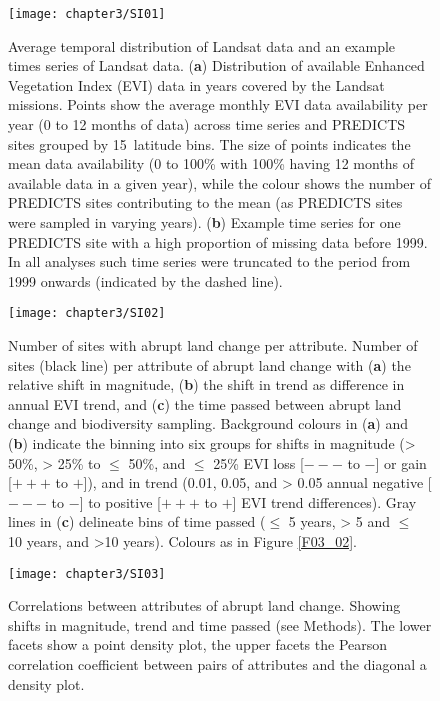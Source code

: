 \begin{figure}[htb]
\centering
\texttt{[image: chapter3/SI01]}
\caption{ Average temporal distribution of Landsat data and an example times series of Landsat data. (\textbf{a}) Distribution of available Enhanced Vegetation Index (EVI) data in years covered by the Landsat missions. Points show the average monthly EVI data availability per year (0 to 12 months of data) across time series and PREDICTS sites grouped by 15\textdegree\ latitude bins. The size of points indicates the mean data availability (0 to 100\% with 100\% having 12 months of available data in a given year), while the colour shows the number of PREDICTS sites contributing to the mean (as PREDICTS sites were sampled in varying years). (\textbf{b}) Example time series for one PREDICTS site with a high proportion of missing data before 1999. In all analyses such time series were truncated to the period from 1999 onwards (indicated by the dashed line).}
\label{SI03_01}
\end{figure}

\begin{figure}[htb]
\centering
\texttt{[image: chapter3/SI02]}
\caption{ Number of sites with abrupt land change per attribute. Number of sites (black line) per attribute of abrupt land change with (\textbf{a}) the relative shift in magnitude, (\textbf{b}) the shift in trend as difference in annual EVI trend, and (\textbf{c}) the time passed between abrupt land change and biodiversity sampling. Background colours in (\textbf{a}) and (\textbf{b}) indicate the binning into six groups for shifts in magnitude (> 50\%, > 25\% to $\leq$ 50\%, and $\leq$ 25\% EVI loss [$---$ to $-$] or gain [$+++$ to $+$]), and in trend (0.01, 0.05, and > 0.05 annual negative [$---$ to $-$] to positive [$+++$ to $+$] EVI trend differences). Gray lines in (\textbf{c}) delineate bins of time passed ($\leq$ 5 years, > 5 and $\leq$ 10 years, and >10 years). Colours as in Figure \ref{F03_02}.}
\label{SI03_02}
\end{figure}



\begin{figure}[htb]
\centering
\texttt{[image: chapter3/SI03]}
\caption{ Correlations between attributes of abrupt land change. Showing shifts in magnitude, trend and time passed (see Methods). The lower facets show a point density plot, the upper facets the Pearson correlation coefficient between pairs of attributes and the diagonal a density plot.}
\label{SI03_03}
\end{figure}

